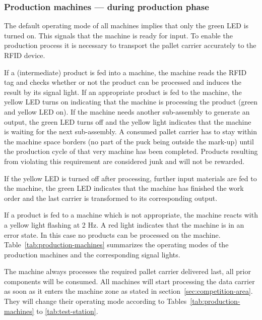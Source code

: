 \documentclass[12pt,twoside]{article}
\begin{document}
\subsubsection{Production machines --- during production phase}
The default operating mode of all machines implies that only the green
LED is turned on. This signals that the machine is ready for input.
To enable the production process it is necessary to transport the
pallet carrier accurately to the RFID device.

If a (intermediate) product is fed into a machine, the machine reads
the RFID tag and checks whether or not the product can be processed
and induces the result by its signal light. If an appropriate product
is fed to the machine, the yellow LED turns on indicating that the
machine is processing the product (green and yellow LED on). If the
machine needs another sub-assembly to generate an output, the green
LED turns off and the yellow light indicates that the machine is
waiting for the next sub-assembly. A consumed pallet carrier has to
stay within the machine space borders (no part of the puck being
outside the mark-up) until the production cycle of that very machine
has been completed.  Products resulting from violating this
requirement are considered junk and will not be rewarded.

If the yellow LED is turned off after processing, further input
materials are fed to the machine, the green LED indicates that the
machine has finished the work order and the last carrier is
transformed to its corresponding output.

 If a product is fed to a
machine which is not appropriate, the machine reacts with a yellow
light flashing at 2 Hz. A red light indicates that the machine is in
an error state.  In this case no products can be processed on the
machine.  Table~\ref{tab:production-machines} summarizes the operating
modes of the production machines and the corresponding signal lights.

The machine always processes the required pallet carrier delivered
last, all prior components will be consumed. All machines will start
processing the data carrier as soon as it enters the machine zone as
stated in section~\ref{sec:competition-area}. They will change their
operating mode according to Tables~\ref{tab:production-machines} to
\ref{tab:test-station}.
\end{document}
